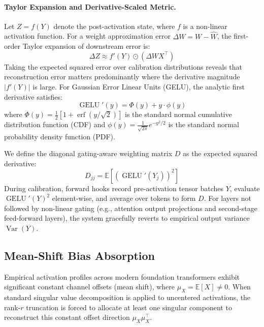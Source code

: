 \documentclass{article}
\begin{document}
\paragraph{Taylor Expansion and Derivative-Scaled Metric.}
Let $Z = f(Y)$ denote the post-activation state, where $f$ is a non-linear activation function. For a weight approximation error $\Delta W = W - \hat{W}$, the first-order Taylor expansion of downstream error is:
\begin{equation}
\Delta Z \approx f'(Y) \odot (\Delta W X^\top)
\end{equation}
Taking the expected squared error over calibration distributions reveals that reconstruction error matters predominantly where the derivative magnitude $|f'(Y)|$ is large. For Gaussian Error Linear Units (GELU), the analytic first derivative satisfies:
\begin{equation}
\operatorname{GELU}'(y) = \Phi(y) + y \cdot \phi(y)
\end{equation}
where $\Phi(y) = \frac{1}{2} [1 + \operatorname{erf}(y / \sqrt{2})]$ is the standard normal cumulative distribution function (CDF) and $\phi(y) = \frac{1}{\sqrt{2\pi}} e^{-y^2 / 2}$ is the standard normal probability density function (PDF).

We define the diagonal gating-aware weighting matrix $D$ as the expected squared derivative:
\begin{equation}
D_{jj} = \mathbb{E} \left[ \left( \operatorname{GELU}'(Y_j) \right)^2 \right]
\end{equation}
During calibration, forward hooks record pre-activation tensor batches $Y$, evaluate $\operatorname{GELU}'(Y)^2$ element-wise, and average over tokens to form $D$. For layers not followed by non-linear gating (e.g., attention output projections and second-stage feed-forward layers), the system gracefully reverts to empirical output variance $\operatorname{Var}(Y)$.

\subsection{Mean-Shift Bias Absorption}
\label{sec:mean_shift}
Empirical activation profiles across modern foundation transformers exhibit significant constant channel offsets (mean shift), where $\mu_X = \mathbb{E}[X] \neq 0$. When standard singular value decomposition is applied to uncentered activations, the rank-$r$ truncation is forced to allocate at least one singular component to reconstruct this constant offset direction $\mu_X \mu_X^\top$.
\end{document}
